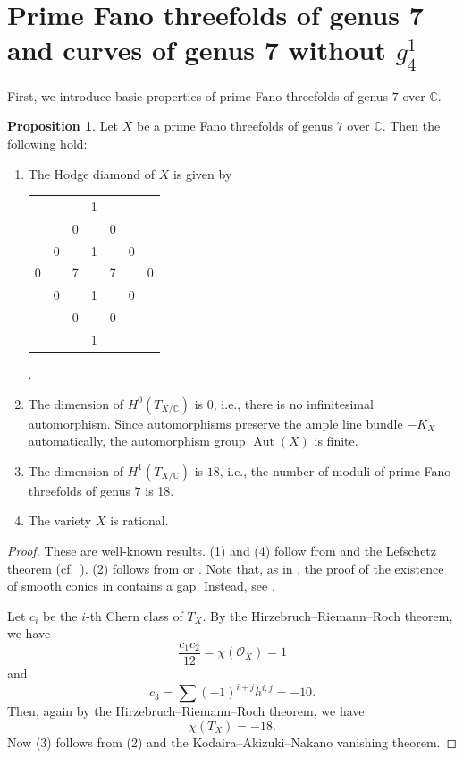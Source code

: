\documentclass[autodetect-engine, a4paper]{amsart}
\theoremstyle{definition}
\newtheorem{prop}[thm]{Proposition}
\def\C{{\mathbb C}}
\def\cO{\mathcal{O}}
\DeclareMathOperator\Aut{\mathrm{Aut}}
\begin{document}
\section{Prime Fano threefolds of genus 7 and curves of genus 7 without $g_4^1$}
\label{section:fanovscurve}
First, we introduce basic properties of prime Fano threefolds of genus $7$ over $\C$.

\begin{prop}
\label{prop:basic}
Let $X$ be a prime Fano threefolds of genus $7$ over $\C$.
Then the following hold:
\begin{enumerate}
\item 
The Hodge diamond of $X$ is given by
\begin{center}
\begin{tabular}{ccccccc}
& & & 1 \\
& & 0 & & 0 \\
& 0 & & 1 & & 0 \\
0 & & 7 & & 7 & & 0 \\
& 0 & & 1 & & 0 \\
& & 0 & & 0 \\
& & & 1
\end{tabular}.
\end{center}
\item 
The dimension of $H^{0} (T_{X/\C})$ is $0$, i.e., there is no infinitesimal automorphism.
Since automorphisms preserve the ample line bundle $-K_{X}$ automatically, the automorphism group $\Aut(X)$ is finite.
\item 
The dimension of $H^1 (T_{X/\C})$ is $18$, i.e., the number of moduli of prime Fano threefolds of genus $7$ is 18.
\item The variety $X$ is rational.
\end{enumerate}
\end{prop}
\begin{proof}
These are well-known results.
(1) and (4) follow from \cite[Corollary 4.4.12 and Theorem 4.5.10]{Iskovskikh-Prokhorov} and the Lefschetz theorem (cf.\ \cite[Remark 3.9]{Kuznetsovspinor}). 
(2) follows from \cite{Prokhorov} or \cite[Corollary 4.3.5]{Kuznetsov-Prokhorov-Shramov}.
Note that, as in \cite[Remark 9.30]{Tanaka2}, the proof of the existence of smooth conics in \cite[Theorem 4.5.10]{Iskovskikh-Prokhorov} contains a gap. Instead, see \cite[Corollary 10.6]{Prokhorovconicnote}.


Let $c_i$ be the $i$-th Chern class of $T_X$.
By the Hirzebruch--Riemann--Roch theorem, we have 
\[
\frac{c_1c_2}{12} = \chi(\cO_X) =1
\]
and
\[
c_3 = \sum (-1)^{i+j} h^{i,j}=-10.
\]
Then, again by the Hirzebruch--Riemann--Roch theorem, we have
\[
\chi(T_X) = -18.
\]
Now (3) follows from (2) and the Kodaira--Akizuki--Nakano vanishing theorem.
\end{proof}
\end{document}
